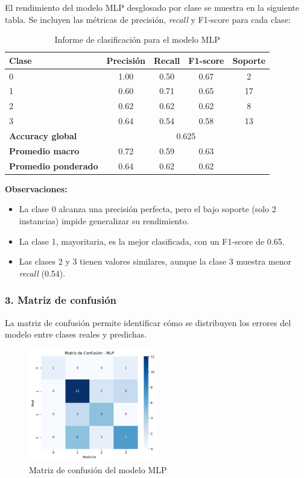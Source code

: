 \documentclass[11pt,a4paper]{article}
\begin{document}
El rendimiento del modelo MLP desglosado por clase se muestra en la siguiente tabla. Se incluyen las métricas de precisión, \textit{recall} y F1-score para cada clase:

\begin{table}[H]
\centering
\small
\begin{tabular}{lcccc}
\toprule
\textbf{Clase} & \textbf{Precisión} & \textbf{Recall} & \textbf{F1-score} & \textbf{Soporte} \\
\midrule
0 & 1.00 & 0.50 & 0.67 & 2 \\
1 & 0.60 & 0.71 & 0.65 & 17 \\
2 & 0.62 & 0.62 & 0.62 & 8 \\
3 & 0.64 & 0.54 & 0.58 & 13 \\
\midrule
\textbf{Accuracy global} & \multicolumn{4}{c}{0.625} \\
\textbf{Promedio macro} & 0.72 & 0.59 & 0.63 &  \\
\textbf{Promedio ponderado} & 0.64 & 0.62 & 0.62 &  \\
\bottomrule
\end{tabular}
\caption*{Informe de clasificación para el modelo MLP}
\end{table}

\textbf{Observaciones:}
\begin{itemize}
    \item La clase 0 alcanza una precisión perfecta, pero el bajo soporte (solo 2 instancias) impide generalizar su rendimiento.
    \item La clase 1, mayoritaria, es la mejor clasificada, con un F1-score de 0.65.
    \item Las clases 2 y 3 tienen valores similares, aunque la clase 3 muestra menor \textit{recall} (0.54).
\end{itemize}

\subsubsection*{3. Matriz de confusión}

La matriz de confusión permite identificar cómo se distribuyen los errores del modelo entre clases reales y predichas.

\begin{figure}[H]
\centering
\includegraphics[width=0.5\textwidth]{img/matriz_confusion_mlp.png}
\caption*{Matriz de confusión del modelo MLP}
\end{figure}
\end{document}
